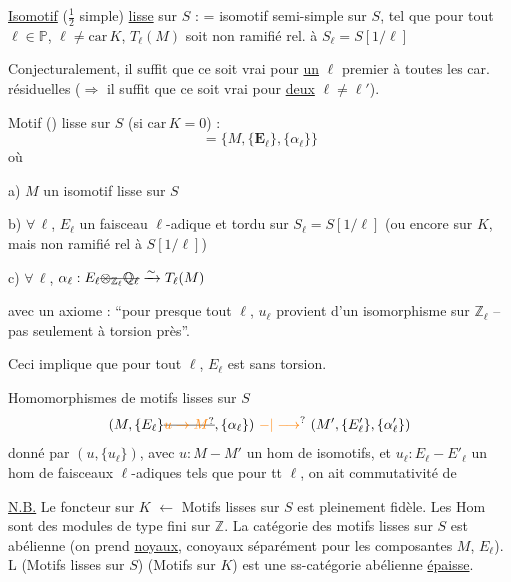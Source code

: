 \uline{Isomotif} ($\frac12$ simple) \uline{lisse} sur $S$ : = isomotif semi-simple  sur $S$, tel que pour tout $\ell\in\mathbb P$, $\ell\ne\mathrm{car}\,K$, $T_\ell(M)$ soit non ramifié rel. à $S_\ell=S[1/\ell]$

Conjecturalement, il suffit que ce soit vrai pour \uline{un} $\ell$ premier à toutes les car. résiduelles ($\Rightarrow$ il suffit que ce soit vrai pour \uline{deux} $\ell\ne\ell'$).

Motif () lisse sur $S$ (si $\mathrm{car}\,K=0$) :
\[
 =\{M,\{\mathbf{E}_\ell\},\{\alpha_\ell\}\}
\]
où

a) $M$ un isomotif lisse sur $S$

b) $\forall\,\ell$, $E_\ell$ un faisceau $\ell$-adique et tordu sur $S_\ell=S[1/\ell]$ (ou encore sur $K$, mais non ramifié rel à $S[1/\ell]$)

c) $\forall\,\ell$, $\alpha_\ell:E_\ell\deleted{\otimes_{\mathbb Z_\ell}\mathbb Q_\ell}\xrightarrow{\sim}T_\ell(M)$

avec un axiome : ``pour presque tout $\ell$, $u_\ell$ provient d'un isomorphisme sur $\mathbb Z_\ell$ -- pas seulement à torsion près''.

Ceci implique que pour  tout $\ell$, $E_\ell$ est sans torsion.

Homomorphismes de motifs lisses sur $S$
\[
 (M,\{E_\ell\}\deleted{\unsure{u\to M}},\{\alpha_\ell\})\ \unsure{\mathord{-}|\longrightarrow}\ (M',\{E'_\ell\},\{\alpha'_\ell\})
\]
donné par $(u,\{u_\ell\})$, avec $u:M-M'$ un hom de isomotifs, et $u_\ell:E_\ell-E'_\ell$ un hom de faisceaux $\ell$-adiques tels que pour tt $\ell$, on ait commutativité de

\uline{N.B.} Le foncteur   sur $K$ $\longleftarrow$ Motifs lisses sur $S$ est pleinement fidèle. Les Hom sont des modules de type fini sur $\mathbb Z$. La catégorie des motifs lisses sur $S$ est abélienne (on prend \uline{noyaux}, conoyaux séparément pour les composantes $M$, $E_\ell$). L  (Motifs lisses sur $S$)  (Motifs sur $K$) est une ss-catégorie abélienne \uline{épaisse}.

